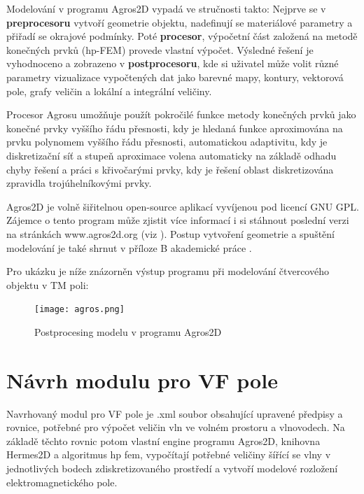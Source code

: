 \documentclass[12pt,a4paper,oneside]{article}
\numberwithin{equation}{section} %
\numberwithin{figure}{section} %
\numberwithin{table}{section} %
\begin{document}
Modelování v programu Agros2D vypadá ve stručnosti takto: Nejprve se v \textbf{preprocesoru} vytvoří geometrie objektu, nadefinují se materiálové parametry a přiřadí se okrajové podmínky. Poté \textbf{procesor}, výpočetní část založená na metodě konečných prvků (hp-FEM) provede vlastní výpočet. Výsledné řešení je vyhodnoceno a zobrazeno v \textbf{postprocesoru}, kde si uživatel může volit různé parametry vizualizace vypočtených dat jako barevné mapy, kontury, vektorová pole, grafy veličin a lokální a integrální veličiny. 

Procesor Agrosu umožňuje použít pokročilé funkce metody konečných prvků jako konečné prvky vyššího řádu přesnosti, kdy je hledaná funkce aproximována na prvku polynomem vyššího řádu přesnosti, automatickou adaptivitu, kdy je diskretizační síť a stupeň aproximace volena automaticky na základě odhadu chyby řešení a práci s křivočarými prvky, kdy je řešení oblast diskretizována zpravidla trojúhelníkovými prvky.

Agros2D je volně šiřitelnou open-source aplikací vyvíjenou pod licencí GNU GPL. Zájemce o tento program může zjistit více informací i si stáhnout poslední verzi na stránkách www.agros2d.org (viz \cite{Agros}). Postup vytvoření geometrie a spuštění modelování je také shrnut v příloze B akademické práce \cite{Koudela}.

Pro ukázku je níže znázorněn výstup programu při modelování čtvercového objektu v TM poli:
\begin{figure}[h] %
\begin{center}
\texttt{[image: agros.png]} %
\caption{Postprocesing modelu v programu Agros2D} %
\end{center}
\end{figure}



\newpage
\section{Návrh modulu pro VF pole}
Navrhovaný modul pro VF pole je .xml soubor obsahující upravené předpisy a rovnice, potřebné pro výpočet veličin vln ve volném prostoru a vlnovodech. Na základě těchto rovnic potom vlastní engine programu Agros2D, knihovna Hermes2D a algoritmus hp fem, vypočítají potřebné veličiny šířící se vlny v jednotlivých bodech zdiskretizovaného prostředí a vytvoří modelové rozložení elektromagnetického pole.
\end{document}
